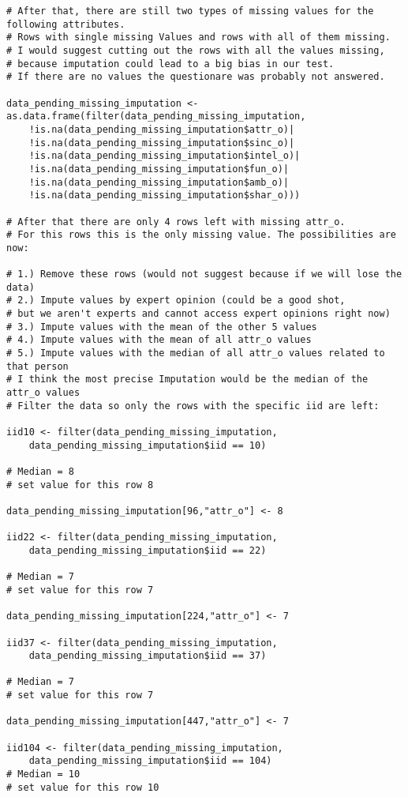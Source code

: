 \begin{verbatim}
# After that, there are still two types of missing values for the following attributes.
# Rows with single missing Values and rows with all of them missing. 
# I would suggest cutting out the rows with all the values missing, 
# because imputation could lead to a big bias in our test. 
# If there are no values the questionare was probably not answered.

data_pending_missing_imputation <-  as.data.frame(filter(data_pending_missing_imputation,
    !is.na(data_pending_missing_imputation$attr_o)|
    !is.na(data_pending_missing_imputation$sinc_o)|
    !is.na(data_pending_missing_imputation$intel_o)|
    !is.na(data_pending_missing_imputation$fun_o)|
    !is.na(data_pending_missing_imputation$amb_o)|
    !is.na(data_pending_missing_imputation$shar_o)))

# After that there are only 4 rows left with missing attr_o.
# For this rows this is the only missing value. The possibilities are now:

# 1.) Remove these rows (would not suggest because if we will lose the data)
# 2.) Impute values by expert opinion (could be a good shot, 
# but we aren't experts and cannot access expert opinions right now)
# 3.) Impute values with the mean of the other 5 values
# 4.) Impute values with the mean of all attr_o values
# 5.) Impute values with the median of all attr_o values related to that person
# I think the most precise Imputation would be the median of the attr_o values
# Filter the data so only the rows with the specific iid are left:

iid10 <- filter(data_pending_missing_imputation,
    data_pending_missing_imputation$iid == 10)

# Median = 8
# set value for this row 8

data_pending_missing_imputation[96,"attr_o"] <- 8

iid22 <- filter(data_pending_missing_imputation,
    data_pending_missing_imputation$iid == 22)

# Median = 7
# set value for this row 7

data_pending_missing_imputation[224,"attr_o"] <- 7

iid37 <- filter(data_pending_missing_imputation,
    data_pending_missing_imputation$iid == 37)

# Median = 7
# set value for this row 7

data_pending_missing_imputation[447,"attr_o"] <- 7

iid104 <- filter(data_pending_missing_imputation,
    data_pending_missing_imputation$iid == 104)
# Median = 10
# set value for this row 10


\end{verbatim}
